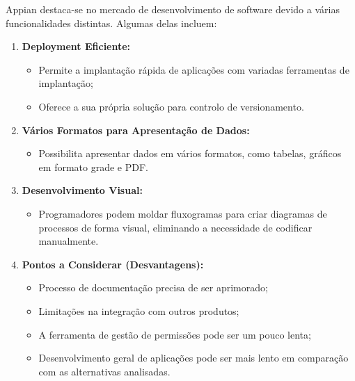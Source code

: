         Appian destaca-se no mercado de desenvolvimento de software devido a várias funcionalidades distintas. Algumas delas incluem:
        
        \begin{enumerate}
            \item \textbf{Deployment Eficiente:}
                \begin{itemize}
                    \item Permite a implantação rápida de aplicações com variadas ferramentas de implantação;
                    \item Oferece a sua própria solução para controlo de versionamento.
                \end{itemize}
            
            \item \textbf{Vários Formatos para Apresentação de Dados:}
                \begin{itemize}
                    \item Possibilita apresentar dados em vários formatos, como tabelas, gráficos em formato grade e PDF.
                \end{itemize}
            
            \item \textbf{Desenvolvimento Visual:}
                \begin{itemize}
                    \item Programadores podem moldar fluxogramas para criar diagramas de processos de forma visual, eliminando a necessidade de codificar manualmente.
                \end{itemize}
            
            \item \textbf{Pontos a Considerar (Desvantagens):}
                \begin{itemize}
                    \item Processo de documentação precisa de ser aprimorado;
                    \item Limitações na integração com outros produtos;
                    \item A ferramenta de gestão de permissões pode ser um pouco lenta;
                    \item Desenvolvimento geral de aplicações pode ser mais lento em comparação com as alternativas analisadas.
                \end{itemize}
        \end{enumerate}
        
